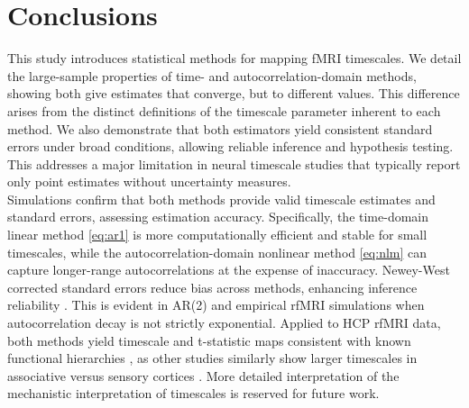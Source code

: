 \documentclass[latex/main.tex]{subfiles}
\begin{document}
\section{Conclusions}
This study introduces statistical methods for mapping fMRI timescales. We detail the large-sample properties of time- and autocorrelation-domain methods, showing both give estimates that converge, but to different values. This difference arises from the distinct definitions of the timescale parameter inherent to each method. We also demonstrate that both estimators yield consistent standard errors under broad conditions, allowing reliable inference and hypothesis testing. This addresses a major limitation in neural timescale studies that typically report only point estimates without uncertainty measures.\\

Simulations confirm that both methods provide valid timescale estimates and standard errors, assessing estimation accuracy. Specifically, the time-domain linear method \eqref{eq:ar1} is more computationally efficient and stable for small timescales, while the autocorrelation-domain nonlinear method \eqref{eq:nlm} can capture longer-range autocorrelations at the expense of inaccuracy. Newey-West corrected standard errors reduce bias across methods, enhancing inference reliability \citep{newey_simple_1987}. This is evident in AR(2) and empirical rfMRI simulations when autocorrelation decay is not strictly exponential. Applied to HCP rfMRI data, both methods yield timescale and t-statistic maps consistent with known functional hierarchies \citep{van_essen_wu-minn_2013},  as other studies similarly show larger timescales in associative versus sensory cortices \citep{raut_hierarchical_2020, shafiei_topographic_2020, lurie_cortical_2024, mitra_lag_2014, kaneoke_variance_2012, wengler_distinct_2020, shinn_functional_2023, manea_intrinsic_2022, ito_cortical_2020, muller_core_2020}. More detailed interpretation of the mechanistic interpretation of timescales is reserved for future work.\\
\end{document}
